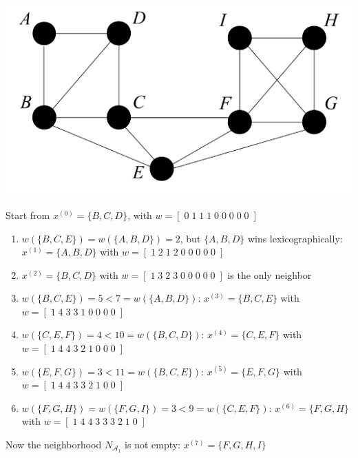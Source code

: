 \newpage

\begin{center}
	\includegraphics[width=0.6\columnwidth]{img/MCP2}
\end{center}

Start from $x^{(0)} = \{B, C , D\}$, with $w = [\; 0 \; 1 \; 1\; 1\; 0\; 0\; 0\; 0\; 0\; ]$
\begin{enumerate}
	\item $w (\{B, C , E \}) = w (\{A, B, D\}) = 2$, but $\{A, B, D\}$ wins lexicographically: $x^{(1)} = \{A, B, D\}$ with $w = [\; 1\; 2\; 1\; 2\; 0\; 0\; 0\; 0\; 0\; ]$
	
	\item $x^{(2)} = \{B, C , D\}$ with $w = [\; 1\; 3\; 2\; 3\; 0\; 0\; 0\; 0\; 0\; ]$ is the only neighbor
	
	\item $w (\{B, C , E \}) = 5 < 7 = w (\{A, B, D\})$: $x^{(3)} = \{B, C , E \}$ with $w = [\; 1\; 4\; 3\; 3\; 1\; 0\; 0\; 0\; 0\; ]$
	
	\item $w (\{C , E , F \}) = 4 < 10 = w (\{B, C , D\})$: $x^{(4)} = \{C , E , F \}$ with $w = [\; 1\; 4\; 4\; 3\; 2\; 1\; 0\; 0\; 0\; ]$
	
	\item $w (\{E , F , G \}) = 3 < 11 = w (\{B, C , E \})$: $x^{(5)} = \{E , F , G \}$ with $w = [\; 1\; 4\; 4\; 3\; 3\; 2\; 1\; 0\; 0\; ]$
	
	\item $w (\{F , G , H\}) = w (\{F , G , I \}) = 3 < 9 = w (\{C , E , F \})$: $x^{(6)} = \{F , G , H\}$ with $w = [\; 1\; 4\; 4\; 3\; 3\; 3\; 2\; 1\; 0\; ]$
\end{enumerate}

Now the neighborhood $N_{\mathcal{A}_1}$ is not empty: $x^{(7)} = \{F , G , H, I \}$

\newpage

